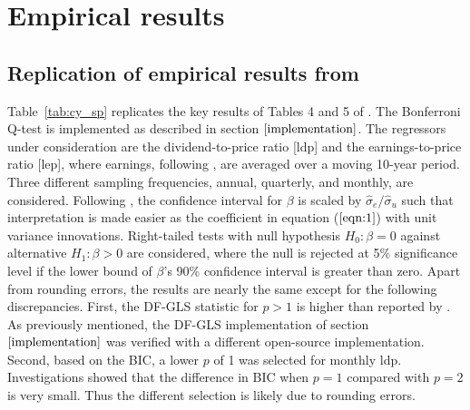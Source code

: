 \documentclass{article}
\begin{document}
\section{Empirical results}
\label{Empirical Results}
\subsection{Replication of empirical results from \citet{campbell2006efficient}}
Table~\vref{tab:cy_sp} replicates the key results of Tables 4 and 5 of \citet{campbell2006efficient}. The Bonferroni Q-test is implemented as described in section $\ref{implementation}$. The regressors under consideration are the dividend-to-price ratio [ldp] and the earnings-to-price ratio [lep], where earnings, following \citet{shiller2000irrational}, are averaged over a moving 10-year period. Three different sampling frequencies, annual, quarterly, and monthly, are considered. Following \citet{campbell2006efficient}, the confidence interval for $\beta$ is scaled by $\widehat{\sigma}_{e} / \widehat{\sigma}_{u}$ such that interpretation is made easier as the coefficient in equation ($\ref{eqn:1}$) with unit variance innovations. Right-tailed tests with null hypothesis $H_0: \beta=0$ against alternative $H_1: \beta>0$ are considered, where the null is rejected at 5\% significance level if the lower bound of $\beta$'s 90\% confidence interval is greater than zero. Apart from rounding errors, the results are nearly the same except for the following discrepancies. First, the DF-GLS statistic for $p>1$ is higher than reported by \citet{campbell2006efficient}.  As previously mentioned, the DF-GLS implementation of section $\ref{implementation}$ was verified with a different open-source implementation. Second, based on the BIC, a lower $p$ of 1 was selected for monthly ldp. Investigations showed that the difference in BIC when $p=1$ compared with $p=2$ is very small. Thus the different selection is likely due to rounding errors. 
\end{document}
